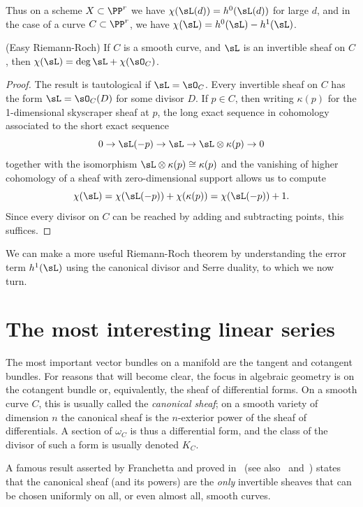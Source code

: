 Thus on a scheme $X\subset \PP^r$ we have $\chi(\sL(d)) = h^0(\sL(d))$ for large $d$, and in the case of a curve $C\subset \PP^r$, we have $\chi(\sL) = h^0(\sL) - h^1(\sL)$.

\begin{theorem} (Easy Riemann-Roch)\label{easy RR}
If $C$ is a smooth curve, and $\sL$ is an invertible sheaf on $C$, then $\chi(\sL) = \deg \sL + \chi(\sO_C)$.
\end{theorem}

\begin{proof}
 The result is tautological if $\sL = \sO_C$. Every invertible sheaf on $C$ has the form $\sL = \sO_C(D)$ for some
divisor $D$. If $p\in C$, then writing $\kappa(p)$ for the 1-dimensional skyscraper sheaf at $p$, the long exact sequence in cohomology
associated to the short exact sequence
$$
0\to \sL(-p) \to \sL \to \sL\otimes \kappa(p)\to 0
$$
together with the isomorphism $\sL\otimes \kappa(p) \cong \kappa(p)$
and the vanishing of higher cohomology of a sheaf with zero-dimensional support allows us to compute 
$$
\chi(\sL) = \chi(\sL(-p)) + \chi(\kappa(p)) = \chi(\sL(-p)) + 1.
$$
Since every divisor on $C$ can be reached by adding and subtracting points, this suffices.
\end{proof}

We can make a more useful Riemann-Roch theorem by understanding the error term $h^1(\sL)$ using
the canonical divisor and Serre duality, to which
we now turn.


\section{The most interesting linear series}

The most important vector bundles on a manifold are the tangent and cotangent bundles. For reasons that
will become clear, the focus in algebraic geometry is on the cotangent bundle or, equivalently, the sheaf of differential forms. On a smooth curve $C$, this is usually called the \emph{canonical sheaf}; on a smooth
variety of dimension $n$ the canonical sheaf is the $n$-exterior power of the sheaf of differentials. A section of 
$\omega_C$ is thus a differential form, and the class of the divisor
of such a form is usually denoted $K_C$. 

\begin{fact}
A famous result asserted by Franchetta and proved in~\cite{Harer} (see also~\cite{MR895568} and~\cite{MR1984659}) states that the canonical sheaf (and its powers) are the \emph{only} invertible sheaves that can be chosen uniformly on all, or even almost all, smooth curves. 
\end{fact}

